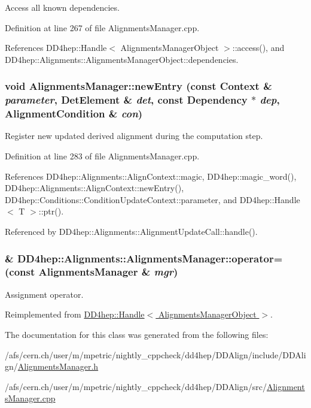 Access all known dependencies. 

Definition at line 267 of file AlignmentsManager.cpp.

References DD4hep::Handle$<$ AlignmentsManagerObject $>$::access(), and DD4hep::Alignments::AlignmentsManagerObject::dependencies.\hypertarget{class_d_d4hep_1_1_alignments_1_1_alignments_manager_a193ada1fb36be0e72fa92f83a4610c80}{
\subsubsection[{newEntry}]{\setlength{\rightskip}{0pt plus 5cm}void AlignmentsManager::newEntry (const {\bf Context} \& {\em parameter}, \/  {\bf DetElement} \& {\em det}, \/  const {\bf Dependency} $\ast$ {\em dep}, \/  {\bf AlignmentCondition} \& {\em con})}}
\label{class_d_d4hep_1_1_alignments_1_1_alignments_manager_a193ada1fb36be0e72fa92f83a4610c80}


Register new updated derived alignment during the computation step. 

Definition at line 283 of file AlignmentsManager.cpp.

References DD4hep::Alignments::AlignContext::magic, DD4hep::magic\_\-word(), DD4hep::Alignments::AlignContext::newEntry(), DD4hep::Conditions::ConditionUpdateContext::parameter, and DD4hep::Handle$<$ T $>$::ptr().

Referenced by DD4hep::Alignments::AlignmentUpdateCall::handle().\hypertarget{class_d_d4hep_1_1_alignments_1_1_alignments_manager_afd59ebd7fe38dfa4030f10dd4cae328d}{
\subsubsection[{operator=}]{\& DD4hep::Alignments::AlignmentsManager::operator= (const {\bf AlignmentsManager} \& {\em mgr})}}
\label{class_d_d4hep_1_1_alignments_1_1_alignments_manager_afd59ebd7fe38dfa4030f10dd4cae328d}


Assignment operator. 

Reimplemented from \hyperlink{class_d_d4hep_1_1_handle_a9bbf8f498df42e81ad26fb00233505a6}{DD4hep::Handle$<$ AlignmentsManagerObject $>$}.

The documentation for this class was generated from the following files:\begin{DoxyCompactItemize}
\item 
/afs/cern.ch/user/m/mpetric/nightly\_\-cppcheck/dd4hep/DDAlign/include/DDAlign/\hyperlink{_alignments_manager_8h}{AlignmentsManager.h}\item 
/afs/cern.ch/user/m/mpetric/nightly\_\-cppcheck/dd4hep/DDAlign/src/\hyperlink{_alignments_manager_8cpp}{AlignmentsManager.cpp}\end{DoxyCompactItemize}
